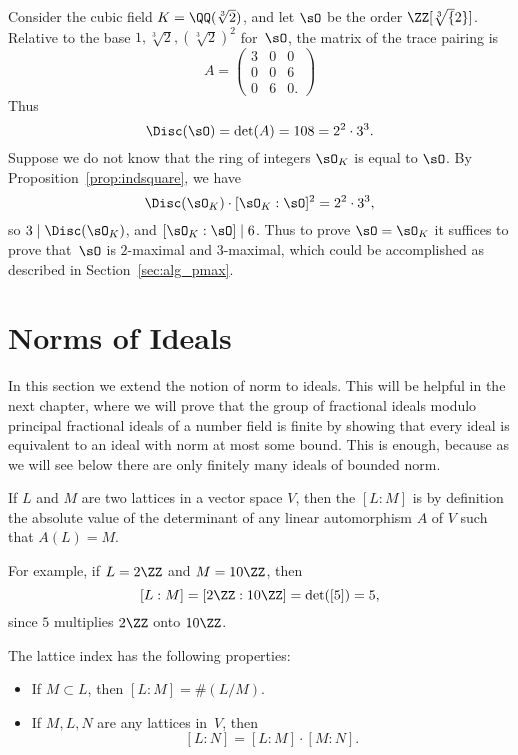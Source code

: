 \begin{example}
  Consider the cubic field $K=\QQ(\sqrt[3]{2})$, and
  let $\sO$ be the order $\ZZ[\sqrt[3]{2}]$.
  Relative to the base $1,\sqrt[3]{2}, (\sqrt[3]{2})^2$ for~$\sO$,
  the matrix of the trace pairing is
  \[
    A = \begin{pmatrix}
      3 & 0 & 0 \\
      0 & 0 & 6 \\
      0 & 6 & 0.
    \end{pmatrix}
  \]
  Thus
  \[
    \Disc(\sO) = \det(A)= 108 = 2^2\cdot 3^3.
  \]
  Suppose we do not know that the ring of integers
  $\sO_K$ is equal to $\sO$.  By Proposition~\ref{prop:indsquare},
  we  have
  \[
    \Disc(\sO_K)\cdot [\sO_K:\sO]^2 = 2^2\cdot 3^3,
  \]
  so $3\mid \Disc(\sO_K)$, and $[\sO_K:\sO] \mid 6$.
  Thus to prove $\sO=\sO_K$ it suffices to prove
  that~$\sO$ is $2$-maximal and $3$-maximal,
  which could be accomplished as described in
  Section~\ref{sec:alg_pmax}.
\end{example}

\section{Norms of Ideals}
In this section we extend the notion of norm to ideals.  This will be
helpful in the next chapter, where
we will prove that the group of fractional ideals modulo principal
fractional ideals of a number field is finite by showing that every
ideal is equivalent to an ideal with norm at most some bound.
This is enough, because as we will see below there are only
finitely many ideals of bounded norm.
\begin{definition}
  If $L$ and $M$ are two lattices in a vector space $V$, then the
   $[L:M]$ is by definition the absolute value of the
  determinant of any linear automorphism $A$ of $V$ such that $A(L)=M$.
\end{definition}
For example, if $L=2\ZZ$ and $M=10\ZZ$, then
\[
  [L:M] = [2\ZZ : 10\ZZ] = \det([5]) = 5,
\]
since $5$ multiplies $2\ZZ$ onto $10\ZZ$.

The lattice index has the
following properties:
\begin{itemize}
  \item If $M\subset L$, then $[L:M]=\#(L/M)$.
  \item If $M, L, N$ are any lattices in~$V$,
  then $$[L:N] = [L:M]\cdot [M:N].$$
\end{itemize}


